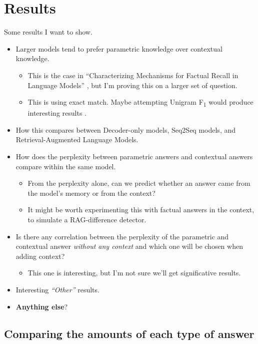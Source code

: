 \section{Results}

Some results I want to show.
\begin{itemize}
	\item Larger models tend to prefer parametric knowledge over contextual knowledge.
		\begin{itemize}
			\item This is the case in ``Characterizing Mechanisms for Factual Recall in Language Models'' \citep{factual_recall}, but I'm proving this on a larger set of question.
			\item This is using exact match. Maybe attempting Unigram F\textsubscript{1} would produce interesting results \citep{kilt}.
		\end{itemize}
	\item How this compares between Decoder-only models, Seq2Seq models, and Retrieval-Augmented Language Models.
	\item How does the perplexity between parametric answers and contextual answers compare within the same model.
		\begin{itemize}
			\item From the perplexity alone, can we predict whether an answer came from the model's memory or from the context?
			\item It might be worth experimenting this with factual answers in the context, to simulate a RAG-difference detector.
		\end{itemize}
	\item Is there any correlation between the perplexity of the parametric and contextual answer \textit{without any context} and which one will be chosen when adding context?
		\begin{itemize}
			\item This one is interesting, but I'm not sure we'll get significative results.
		\end{itemize}
	\item Interesting \textsl{``Other''} results.
	\item \textbf{Anything else}?
\end{itemize}

\subsection{Comparing the amounts of each type of answer}


